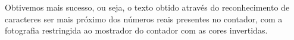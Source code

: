 Obtivemos mais sucesso, ou seja, o texto obtido através do reconhecimento de caracteres ser mais próximo dos números reais presentes no contador, com a fotografia restringida ao mostrador do contador com as cores invertidas.




















